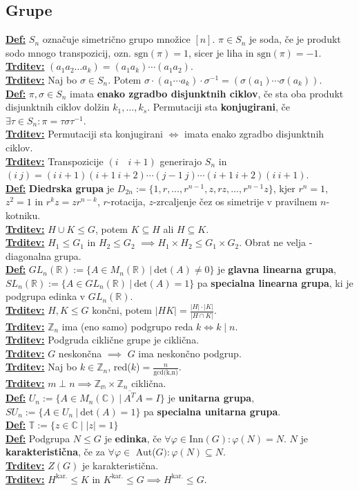 \documentclass[a4paper,oneside,8pt,landscape]{extarticle}
\renewcommand{\phi}{\varphi}
\let\oldtextbf\textbf
\renewcommand{\textbf}[1]{\oldtextbf{\boldmath #1}}
\newcommand{\definicija}[1]{\textbf{\underline{Def:} }{#1}\\}
\newcommand{\trditev}[1]{\textbf{\underline{Trditev:} }{#1}\\}
\newcommand{\bt}[1]{\textbf{#1}}
\begin{document}
\begin{multicols*}{3}
\subsection*{Grupe}
\definicija{$S_n$ označuje simetrično grupo množice $[n]$. $\pi \in S_n$ je soda, če je produkt sodo mnogo transpozicij, ozn. $\text{sgn}(\pi)=1$, sicer je liha in $\text{sgn}(\pi)=-1$.}
\trditev{$(a_1 a_2\dots a_k) = (a_1 a_k)\cdots (a_1 a_2).$}
\trditev{Naj bo $\sigma \in S_n$. Potem $\sigma \cdot (a_1 \cdots a_k)\cdot \sigma^{-1} = (\sigma(a_1)\cdots \sigma (a_k)).$}
\definicija{$\pi,\sigma \in S_n$ imata \bt{enako zgradbo disjunktnih ciklov}, če sta oba produkt disjunktnih ciklov dolžin $k_1,\dots,k_s$. Permutaciji sta \bt{konjugirani}, če $\exists\tau\in S_n: \pi = \tau \sigma \tau^{-1}$.}
\trditev{Permutaciji sta konjugirani $\iff$ imata enako zgradbo disjunktnih ciklov.}
\trditev{Transpozicije $(i \quad i+1)$ generirajo $S_n$ in $(i \ j) = (i\  i+1)(i+1 \ i+2)\cdots (j-1 \ j)\cdots (i+1 \ i+2)(i\ i+1)$.}
\definicija{\bt{Diedrska grupa} je $D_{2n} := \{1,r,\dots,r^{n-1}, z, rz,\dots,r^{n-1}z\}$, kjer $r^n =1$, $z^2=1$ in $r^kz=zr^{n-k}$, $r$-rotacija, $z$-zrcaljenje čez os simetrije v pravilnem $n$-kotniku.}
\trditev{$H\cup K \leq G$, potem $K\subseteq H$ ali $H \subseteq K$.}
\trditev{$H_1\leq G_1$ in $H_2\leq G_2$ $\implies  H_1\times H_2 \leq G_1 \times G_2$. Obrat ne velja - diagonalna grupa.}
\definicija{$GL_n(\mathbb{R}) := \{A\in M_n(\mathbb{R}) \ | \ \text{det}(A) \neq 0\}$ je \bt{glavna linearna grupa}, $SL_n(\mathbb{R}) := \{A\in GL_n(\mathbb{R}) \ | \ \text{det}(A) =1\}$ pa \bt{specialna linearna grupa}, ki je podgrupa edinka v $GL_n(\mathbb{R})$.}
\trditev{$H,K\leq G$ končni, potem $|HK| = \frac{|H|\cdot|K|}{|H\cap K|}$.}
\trditev{$\mathbb{Z}_n$ ima (eno samo) podgrupo reda $k \iff k \mid n$.}
\trditev{Podgruda ciklične grupe je ciklična.}
\trditev{$G$ neskončna $\implies$ $G$ ima neskončno podgrup.}
\trditev{Naj bo $k\in \mathbb{Z}_n$, red($k$)$=\frac{n}{\text{gcd(k,n)}}$.}
\trditev{$m\perp n \implies $$\mathbb{Z_m}\times \mathbb{Z}_n$ ciklična.}
\definicija{$U_n := \{A\in M_n(\mathbb{C}) \ | \ \overline{A^T}A=I\}$ je \bt{unitarna grupa}, $SU_n:=\{A\in U_n \ | \ \text{det}(A) =1\}$ pa \bt{specialna unitarna grupa}.}
\definicija{$\mathbb{T} := \{z\in\mathbb{C} \mid |z|=1\}$}
\definicija{Podgrupa $N\leq G$ je \bt{edinka}, če $\forall \phi \in \text{Inn}(G): \phi(N)=N$. $N$ je \bt{karakteristična}, če za $\forall \phi \in$ Aut($G):\phi(N)\subseteq N$.}
\trditev{$Z(G)$ je karakteristična.}
\trditev{$H^{\text{kar.}}\leq K$ in $K^{\text{kar.}}\leq G \implies H^{\text{kar.}}\leq G$.}
\vspace{-15pt}

\end{multicols*}
\end{document}
